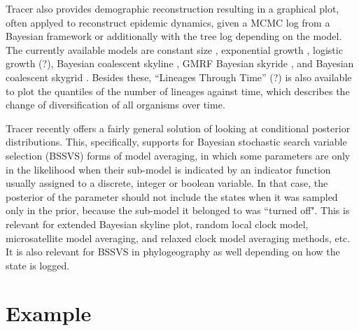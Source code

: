 \documentclass{bioinfo}
\begin{document}
Tracer also provides demographic reconstruction resulting in a graphical plot, often applyed to reconstruct epidemic dynamics, given a MCMC log from a Bayesian framework or additionally with the tree log depending on the model.
The currently available models are constant size \citep{drummond2002estimating}, exponential growth \citep{drummond2002estimating}, logistic growth (?), Bayesian coalescent skyline \citep{drummond2005bayesian}, GMRF Bayesian skyride \citep{minin2008smooth}, and Bayesian coalescent skygrid \citep{gill2012improving}.
Besides these, ``Lineages Through Time'' (?) is also available to plot the quantiles of the number of lineages against time, which describes the change of diversification of all organisms over time. %

Tracer recently offers a fairly general solution of looking at conditional posterior distributions. This, specifically, supports for Bayesian stochastic search variable selection (BSSVS) forms of model averaging, in which some parameters are only in the likelihood when their sub-model is indicated by an indicator function usually assigned to a discrete, integer or boolean variable. In that case, the posterior of the parameter should not include the states when it was sampled only in the prior, because the sub-model it belonged to was ``turned off". This is relevant for extended Bayesian skyline plot, random local clock model, microsatellite model averaging, and relaxed clock model averaging methods, etc. It is also relevant for BSSVS in phylogeography as well depending on how the state is logged.


\section*{Example}
\end{document}
